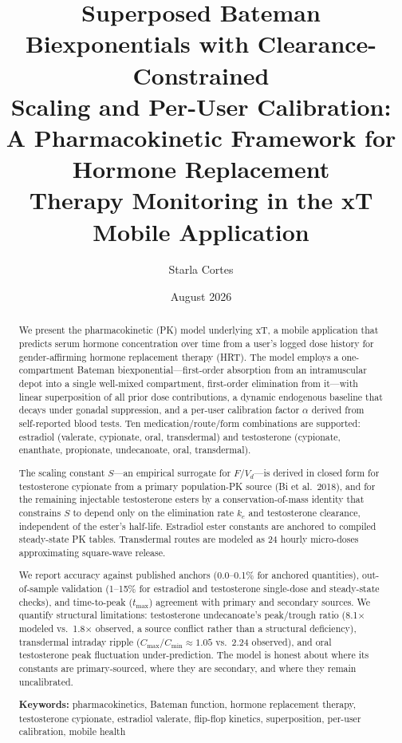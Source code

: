 \documentclass[11pt,a4paper]{article}
\title{\textbf{Superposed Bateman Biexponentials with Clearance-Constrained\\
Scaling and Per-User Calibration:}\\[0.3em]
\large A Pharmacokinetic Framework for Hormone Replacement\\
Therapy Monitoring in the xT Mobile Application}
\author{Starla Cortes}
\date{August 2026}
\begin{document}
\maketitle

\begin{abstract}
\noindent
We present the pharmacokinetic (PK) model underlying xT, a mobile
application that predicts serum hormone concentration over time from a
user's logged dose history for gender-affirming hormone replacement
therapy (HRT). The model employs a one-compartment Bateman
biexponential---first-order absorption from an intramuscular depot into a
single well-mixed compartment, first-order elimination from it---with
linear superposition of all prior dose contributions, a dynamic
endogenous baseline that decays under gonadal suppression, and a
per-user calibration factor $\alpha$ derived from self-reported blood
tests. Ten medication/route/form combinations are supported: estradiol
(valerate, cypionate, oral, transdermal) and testosterone (cypionate,
enanthate, propionate, undecanoate, oral, transdermal).

The scaling constant $S$---an empirical surrogate for $F/V_d$---is
derived in closed form for testosterone cypionate from a primary
population-PK source (Bi et al.\ 2018), and for the remaining injectable
testosterone esters by a conservation-of-mass identity that constrains
$S$ to depend only on the elimination rate $k_e$ and testosterone
clearance, independent of the ester's half-life. Estradiol ester
constants are anchored to compiled steady-state PK tables. Transdermal
routes are modeled as 24 hourly micro-doses approximating square-wave
release.

We report accuracy against published anchors (0.0--0.1\% for anchored
quantities), out-of-sample validation (1--15\% for estradiol and
testosterone single-dose and steady-state checks), and time-to-peak
($t_{\max}$) agreement with primary and secondary sources. We
quantify structural limitations: testosterone undecanoate's peak/trough
ratio (8.1$\times$ modeled vs.\ 1.8$\times$ observed, a source conflict
rather than a structural deficiency), transdermal intraday ripple
($C_{\max}/C_{\min} \approx 1.05$ vs.\ 2.24 observed), and oral
testosterone peak fluctuation under-prediction. The model is
honest about where its constants are primary-sourced, where they are
secondary, and where they remain uncalibrated.

\textbf{Keywords:} pharmacokinetics, Bateman function, hormone
replacement therapy, testosterone cypionate, estradiol valerate,
flip-flop kinetics, superposition, per-user calibration, mobile health
\end{abstract}
\end{document}
